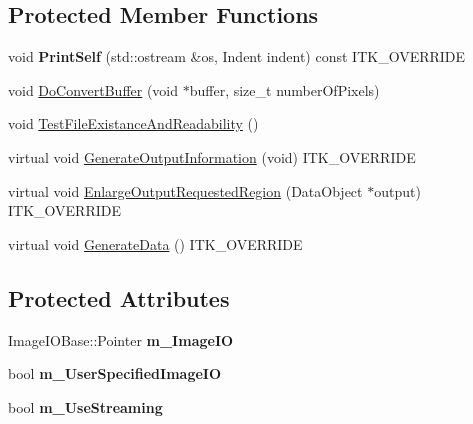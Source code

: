 \subsection*{Protected Member Functions}
\begin{DoxyCompactItemize}
\item 
void {\bfseries Print\+Self} (std\+::ostream \&os, Indent indent) const I\+T\+K\+\_\+\+O\+V\+E\+R\+R\+I\+DE\hypertarget{classitk_1_1_image_file_reader_k_w_abeb559364dac015e1430ef6fa0086d33}{}\label{classitk_1_1_image_file_reader_k_w_abeb559364dac015e1430ef6fa0086d33}

\item 
void \hyperlink{classitk_1_1_image_file_reader_k_w_a36590b67313b769b377ab84dab64e6dc}{Do\+Convert\+Buffer} (void $\ast$buffer, size\+\_\+t number\+Of\+Pixels)
\item 
void \hyperlink{classitk_1_1_image_file_reader_k_w_a68e1c6d1289530941de1424844f481b5}{Test\+File\+Existance\+And\+Readability} ()
\item 
virtual void \hyperlink{classitk_1_1_image_file_reader_k_w_a5fc2235fca283e451de26035fd237cda}{Generate\+Output\+Information} (void) I\+T\+K\+\_\+\+O\+V\+E\+R\+R\+I\+DE
\item 
virtual void \hyperlink{classitk_1_1_image_file_reader_k_w_a313f37f91aad5e0c91fe9b37b9f1e156}{Enlarge\+Output\+Requested\+Region} (Data\+Object $\ast$output) I\+T\+K\+\_\+\+O\+V\+E\+R\+R\+I\+DE
\item 
virtual void \hyperlink{classitk_1_1_image_file_reader_k_w_a1096f13bf512a24092565fa6a3a82508}{Generate\+Data} () I\+T\+K\+\_\+\+O\+V\+E\+R\+R\+I\+DE
\end{DoxyCompactItemize}
\subsection*{Protected Attributes}
\begin{DoxyCompactItemize}
\item 
Image\+I\+O\+Base\+::\+Pointer {\bfseries m\+\_\+\+Image\+IO}\hypertarget{classitk_1_1_image_file_reader_k_w_ad8257c25171cf6c698f19ece08189535}{}\label{classitk_1_1_image_file_reader_k_w_ad8257c25171cf6c698f19ece08189535}

\item 
bool {\bfseries m\+\_\+\+User\+Specified\+Image\+IO}\hypertarget{classitk_1_1_image_file_reader_k_w_ab7a9a3dacdffcbfca83153ff40665ac4}{}\label{classitk_1_1_image_file_reader_k_w_ab7a9a3dacdffcbfca83153ff40665ac4}

\item 
bool {\bfseries m\+\_\+\+Use\+Streaming}\hypertarget{classitk_1_1_image_file_reader_k_w_a7b56980da3e50436905c3ae5731fc557}{}\label{classitk_1_1_image_file_reader_k_w_a7b56980da3e50436905c3ae5731fc557}

\end{DoxyCompactItemize}


